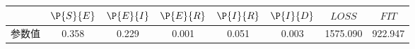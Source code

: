 \begin{tabular}{cccccccc}
\hline
&$\P{S}{E}$&$\P{E}{I}$&$\P{E}{R}$&$\P{I}{R}$&$\P{I}{D}$&$LOSS$&$FIT$\\
\hline
参数值&0.358&0.229&0.001&0.051&0.003&1575.090&922.947\\
\hline
\end{tabular}